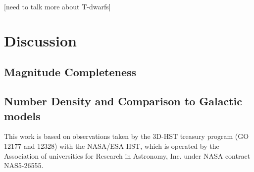 \documentclass[manuscript]{aastex}
\begin{document}
[need to talk more about T-dwarfs]

\section{Discussion}
\subsection{Magnitude Completeness}
\subsection{Number Density and Comparison to Galactic models}

\acknowledgements

This work is based on observations taken by the 3D-HST treasury program (GO 12177 and 12328) with the NASA/ESA HST, which is operated by the Association of universities for Research in Astronomy, Inc. under NASA contract NAS5-26555.


%
%
 

\end{document}
